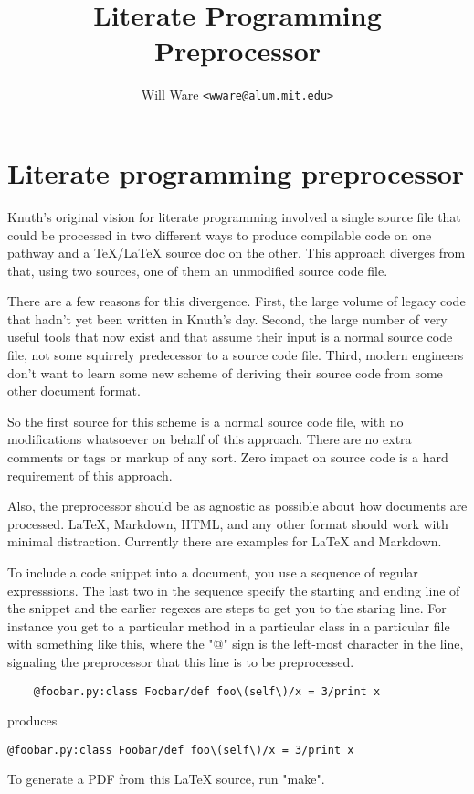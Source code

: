 \documentclass[11pt]{article}
\title{Literate Programming Preprocessor}
\author{Will Ware \texttt{<wware@alum.mit.edu>}}
\date{}
\begin{document}
\thispagestyle{plain}
\maketitle

\section{Literate programming preprocessor}

Knuth's original vision for literate programming involved a single source file that
could be processed in two different ways to produce compilable code on one pathway
and a TeX/LaTeX source doc on the other. This approach diverges from that, using two
sources, one of them an unmodified source code file.

There are a few reasons for this divergence. First, the large volume of legacy code
that hadn't yet been written in Knuth's day. Second, the large number of very useful
tools that now exist and that assume their input is a normal source code file, not
some squirrely predecessor to a source code file. Third, modern engineers don't want
to learn some new scheme of deriving their source code from some other document
format.

So the first source for this scheme is a normal source code file, with no modifications
whatsoever on behalf of this approach. There are no extra comments or tags or markup
of any sort. Zero impact on source code is a hard requirement of this approach.

Also, the preprocessor should be as agnostic as possible about how documents are
processed. LaTeX, Markdown, HTML, and any other format should work with minimal
distraction. Currently there are examples for LaTeX and Markdown.

To include a code snippet into a document, you use a sequence of regular expresssions.
The last two in the sequence specify the starting and ending line of the snippet
and the earlier regexes are steps to get you to the staring line. For instance you
get to a particular method in a particular class in a particular file with something
like this, where the "@" sign is the left-most character in the line, signaling the
preprocessor that this line is to be preprocessed.

\begin{verbatim}
    @foobar.py:class Foobar/def foo\(self\)/x = 3/print x
\end{verbatim}

produces

\begin{verbatim}
@foobar.py:class Foobar/def foo\(self\)/x = 3/print x
\end{verbatim}

To generate a PDF from this LaTeX source, run "make".
\end{document}
